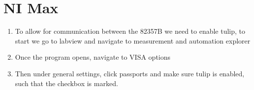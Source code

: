 \documentclass{article}
\begin{document}
    \section*{NI Max}
    \begin{enumerate}
        \item To allow for communication between the 82357B we need to enable tulip, to start we go to labview and navigate to measurement and automation explorer
        
        \vspace{.1in}
        \begin{center}
        \end{center}
        \vspace{.1in}

        \item Once the program opens, navigate to VISA options
        
        \vspace{.1in}
        \begin{center}
        \end{center}
        \vspace{.1in}
        
        \item Then under general settings, click passports and make sure tulip is enabled, such that the checkbox is marked.
        

\end{enumerate}
\end{document}
